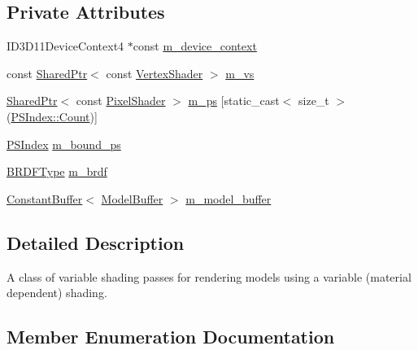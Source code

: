 \subsection*{Private Attributes}
\begin{DoxyCompactItemize}
\item 
I\+D3\+D11\+Device\+Context4 $\ast$const \hyperlink{classmage_1_1_variable_shading_pass_a6f493a69566574b4818e2ba578ec0c1a}{m\+\_\+device\+\_\+context}
\item 
const \hyperlink{namespacemage_a1e01ae66713838a7a67d30e44c67703e}{Shared\+Ptr}$<$ const \hyperlink{classmage_1_1_vertex_shader}{Vertex\+Shader} $>$ \hyperlink{classmage_1_1_variable_shading_pass_aa91a1e8628c2f671adadd919376aa67e}{m\+\_\+vs}
\item 
\hyperlink{namespacemage_a1e01ae66713838a7a67d30e44c67703e}{Shared\+Ptr}$<$ const \hyperlink{namespacemage_a27ecaf266420ee7a494d64edc0757129}{Pixel\+Shader} $>$ \hyperlink{classmage_1_1_variable_shading_pass_aacd5b6b967a0fcfe7510e289c3d630a0}{m\+\_\+ps} \mbox{[}static\+\_\+cast$<$ size\+\_\+t $>$(\hyperlink{classmage_1_1_variable_shading_pass_a99a5986785950a884405617f8d05cae5ae93f994f01c537c4e2f7d8528c3eb5e9}{P\+S\+Index\+::\+Count})\mbox{]}
\item 
\hyperlink{classmage_1_1_variable_shading_pass_a99a5986785950a884405617f8d05cae5}{P\+S\+Index} \hyperlink{classmage_1_1_variable_shading_pass_acb1d0d78a9de9afc2d668d87134c5ec5}{m\+\_\+bound\+\_\+ps}
\item 
\hyperlink{namespacemage_af1044f87544bc38427766a8c795d2f26}{B\+R\+D\+F\+Type} \hyperlink{classmage_1_1_variable_shading_pass_ac6147f2068fd7727fe2d78584ff68767}{m\+\_\+brdf}
\item 
\hyperlink{classmage_1_1_constant_buffer}{Constant\+Buffer}$<$ \hyperlink{structmage_1_1_model_buffer}{Model\+Buffer} $>$ \hyperlink{classmage_1_1_variable_shading_pass_ab83602f0ffa6c0a3519ffaa467ae113a}{m\+\_\+model\+\_\+buffer}
\end{DoxyCompactItemize}


\subsection{Detailed Description}
A class of variable shading passes for rendering models using a variable (material dependent) shading. 

\subsection{Member Enumeration Documentation}
\hypertarget{classmage_1_1_variable_shading_pass_a99a5986785950a884405617f8d05cae5}{}\label{classmage_1_1_variable_shading_pass_a99a5986785950a884405617f8d05cae5} 
